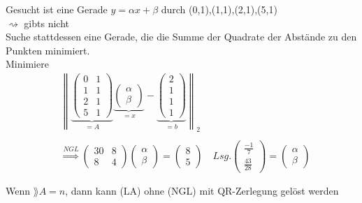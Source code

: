 \begin{Beispiel}
	Gesucht ist eine Gerade $y=\alpha x+\beta$ durch (0,1),(1,1),(2,1),(5,1)\\
	$\rightsquigarrow$ gibts nicht\\
	Suche stattdessen eine Gerade, die die Summe der Quadrate der Abstände zu den Punkten minimiert.\\
	Minimiere \begin{align*}
	&\left\|\underbrace{\begin{pmatrix}
	0 & 1\\1 & 1\\2 & 1\\ 5  & 1
	\end{pmatrix}}_{=A}\underbrace{\begin{pmatrix}
	\alpha\\\beta
	\end{pmatrix}}_{=x}-\underbrace{\begin{pmatrix}
	2\\1\\1\\1
	\end{pmatrix}}_{=b}\right\|_2\\\\
	&\overset{NGL}{\Rightarrow} \begin{pmatrix}
	30 & 8\\8 & 4
	\end{pmatrix}\begin{pmatrix}
	\alpha\\\beta
	\end{pmatrix}=\begin{pmatrix}
	8\\5
	\end{pmatrix}\quad
	Lsg.\begin{pmatrix}
	\frac{-1}{7}\\\frac{43}{28}
	\end{pmatrix}=\begin{pmatrix}
	\alpha\\\beta
	\end{pmatrix}
	\end{align*}
\end{Beispiel}
\begin{Bemerkung}
	Wenn $\rang A = n$, dann kann (LA) ohne (NGL) mit QR-Zerlegung gelöst werden
\end{Bemerkung}

